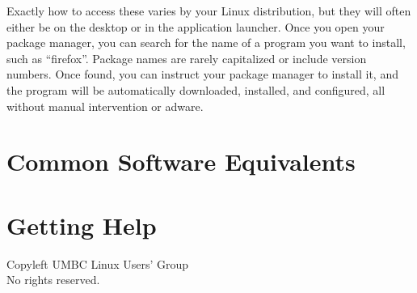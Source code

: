 \documentclass[11pt,notumble]{leaflet}
\begin{document}
Exactly how to access these varies by your Linux distribution, but they will
often either be on the desktop or in the application launcher. Once you open
your package manager, you can search for the name of a program you want to
install, such as ``firefox''. Package names are rarely capitalized or include
version numbers. Once found, you can instruct your package manager to install
it, and the program will be automatically downloaded, installed, and configured,
all without manual intervention or adware.


\section{Common Software Equivalents}
\label{section:common-software-equivalents}

\section{Getting Help}
\label{section:getting-help}

\vfill
\begin{center} \small 
    \textcopyleft{} Copyleft \the\year{} UMBC Linux Users' Group \\
    No rights reserved.
\end{center}
\end{document}
